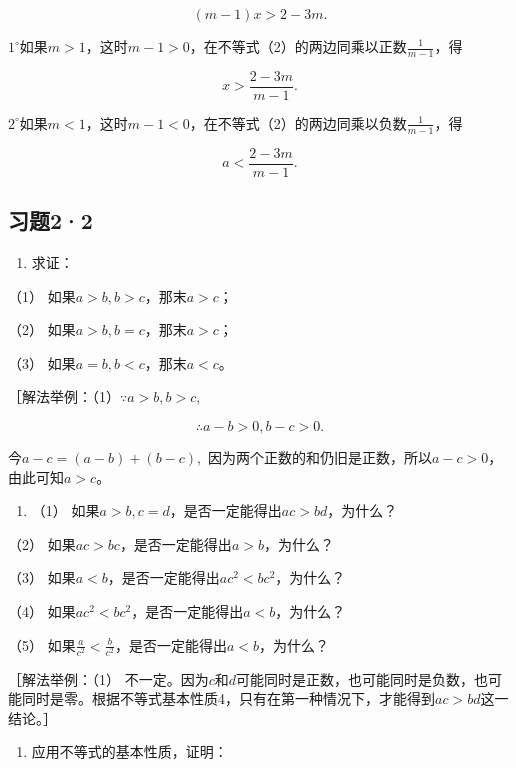 \[
(m - 1) x > 2 - 3 m. \tag {2}
\]

\(1^{\circ}\)如果\(m > 1\)，这时\(m - 1 > 0\)，在不等式（2）的两边同乘以正数\(\frac{1}{m - 1}\)，得

\[
x > \frac{2 - 3 m}{m - 1}.
\]

\(2^{\circ}\)如果\(m < 1\)，这时\(m - 1 < 0\)，在不等式（2）的两边同乘以负数\(\frac{1}{m - 1}\)，得

\[
a < \frac{2 - 3 m}{m - 1}.
\]

\subsection{习题2·2}

\begin{enumerate}
\item
  求证：
\end{enumerate}

（1） 如果\(a > b, b > c\)，那末\(a > c\)；

（2） 如果\(a > b, b = c\)，那末\(a > c\)；

（3） 如果\(a = b, b < c\)，那末\(a < c\)。

［解法举例：（1）\(\because a > b, b > c,\)

\[
\therefore a - b > 0, b - c > 0.
\]

今\(a - c = (a - b) + (b - c),\)
因为两个正数的和仍旧是正数，所以\(a - c > 0\)，由此可知\(a > c\)。

\begin{enumerate}[start=2]
\item
  （1） 如果\(a > b, c = d\)，是否一定能得出\(ac > bd\)，为什么？
\end{enumerate}

（2） 如果\(ac > bc\)，是否一定能得出\(a > b\)，为什么？

（3） 如果\(a < b\)，是否一定能得出\(ac^2 < bc^2\)，为什么？

（4） 如果\(ac^2 < bc^2\)，是否一定能得出\(a < b\)，为什么？

（5）
如果\(\frac{a}{c^2} < \frac{b}{c^2}\)，是否一定能得出\(a < b\)，为什么？

［解法举例：（1）
不一定。因为\(c\)和\(d\)可能同时是正数，也可能同时是负数，也可能同时是零。根据不等式基本性质4，只有在第一种情况下，才能得到\(ac > bd\)这一结论。］

\begin{enumerate}[start=3]
\item
  应用不等式的基本性质，证明：
\end{enumerate}

